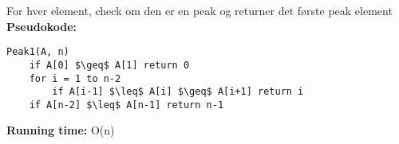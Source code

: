 For hver element, check om den er en peak og returner det første peak element\\
\textbf{Pseudokode:}
\begin{lstlisting}[frame=single, mathescape=true]
Peak1(A, n)
	if A[0] $\geq$ A[1] return 0
	for i = 1 to n-2
		if A[i-1] $\leq$ A[i] $\geq$ A[i+1] return i
	if A[n-2] $\leq$ A[n-1] return n-1
\end{lstlisting}
\textbf{Running time:} O(n)
